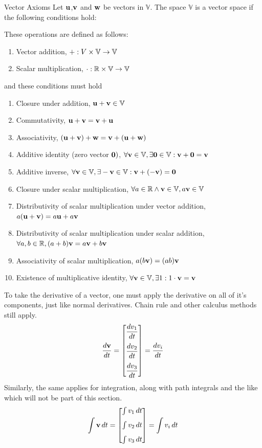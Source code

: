 		\begin{definition}{Vector Axioms}
			Let $\vb{u}$,$\vb{v}$ and $\vb{w}$ be vectors in $\mathbb{V}$. The space $\mathbb{V}$ is a vector space if the following conditions hold: \vspace{1em}
		
			These operations are defined as follows:
			
			\begin{enumerate}
				\item Vector addition, $+:V\times \mathbb{V}\to \mathbb{V}$
				\item Scalar multiplication, $\cdot:\mathbb{R}\times \mathbb{V}\to \mathbb{V}$
			\end{enumerate}
			and these conditions must hold
			\begin{enumerate}
				\item Closure under addition, $\vb{u}+\vb{v}\in\mathbb{V}$
				\item Commutativity, $\vb{u}+\vb{v}=\vb{v}+\vb{u}$
				\item Associativity, $(\vb{u}+\vb{v})+\vb{w}=\vb{v}+(\vb{u}+\vb{w})$
				\item Additive identity (zero vector $\vb{0})$, $\forall\vb{v}\in\mathbb{V},\exists\vb{0}\in\mathbb{V}:\vb{v}+\vb{0}=\vb{v}$
				\item Additive inverse, $\forall\vb{v}\in\mathbb{V},\exists-\vb{v}\in\mathbb{V}:\vb{v}+(-\vb{v})=\vb{0}$
				\item Closure under scalar multiplication, $\forall a \in\mathbb{R}\land \vb{v}\in\mathbb{V}, a\vb{v}\in\mathbb{V}$
				\item Distributivity of scalar multiplication under vector addition, $a(\vb{u}+\vb{v})=a\vb{u}+a\vb{v}$
				\item Distributivity of scalar multiplication under scalar addition,\\ $\forall a,b\in\mathbb{R}, (a+b)\vb{v}=a\vb{v}+b\vb{v}$
				\item Associativity of scalar multiplication, $a(b\vb{v})=(ab)\vb{v}$
				\item Existence of multiplicative identity, $\forall \vb{v}\in\mathbb{V},\exists1:1\cdot \vb{v}=\vb{v}$
			\end{enumerate}
		\end{definition}
		To take the derivative of a vector, one must apply the derivative on all of it's components, just like normal derivatives. Chain rule and other calculus methods still apply.
		\begin{equation}
			\frac{d\vb v}{dt} = \mqty[
				\dfrac{dv_1}{dt}\\[10pt]
				\dfrac{dv_2}{dt}\\[10pt]
				\dfrac{dv_3}{dt}]
			=\dv{v_i}{t}
		\end{equation}
		Similarly, the same applies for integration, along with path integrals and the like which will not be part of this section.
		\begin{equation}
			\int \vb {v} \dd{t} = \mqty[\int v_1 \dd{t}\\[8pt]  \int v_2 \dd{t}\\[8pt] \int v_3 \dd{t}] =  \int v_i \dd{t}
		\end{equation}
